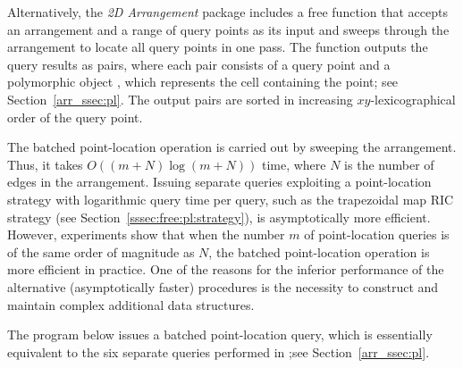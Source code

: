 Alternatively, the \emph{2D Arrangement} package includes a free
 function that accepts an arrangement and a range of
query points as its input and sweeps through the arrangement to
locate all query points in one pass. The function outputs the query
results as pairs, where each pair consists of a query point
and a polymorphic object , which represents the
cell containing the point; see Section~\ref{arr_ssec:pl}. The output
pairs are sorted in increasing $xy$-lexicographical order of the
query point.

The batched point-location operation is carried out by sweeping the
arrangement. Thus, it takes $O((m+N)\log{(m+N)})$  time, where $N$
is the number of edges in the arrangement. Issuing separate queries
exploiting a point-location strategy with logarithmic query time
per query, such as the trapezoidal map RIC strategy (see
Section~\ref{sssec:free:pl:strategy}), is asymptotically more
efficient. However, experiments show that when the number $m$ of
point-location queries is of the same order of magnitude as $N$,
the batched point-location operation is more efficient in practice. 
One of the reasons for the inferior performance of the alternative
(asymptotically faster) procedures is the necessity to construct
and maintain complex additional data structures.

The program below issues a batched point-location query, which
is essentially equivalent to the six separate queries performed in
;see Section~\ref{arr_ssec:pl}.

